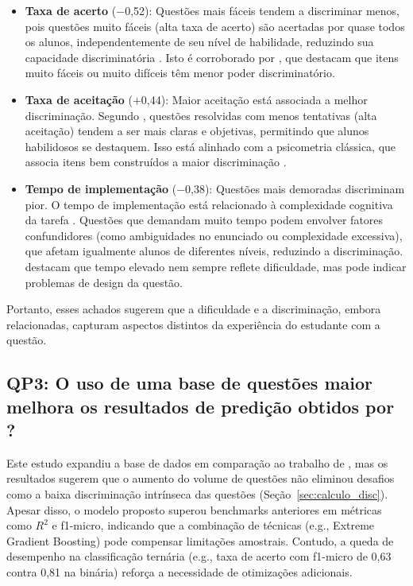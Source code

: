 \documentclass[12pt]{article}
\begin{document}
\begin{itemize}
    \item \textbf{Taxa de acerto} ($-$0,52): Questões mais fáceis tendem a discriminar menos, pois questões muito fáceis (alta taxa de acerto) são acertadas por quase todos os alunos, independentemente de seu nível de habilidade, reduzindo sua capacidade discriminatória \cite{Liz2020}. Isto é corroborado por \cite{pelanek2022complexity}, que destacam que itens muito fáceis ou muito difíceis têm menor poder discriminatório.
    \item \textbf{Taxa de aceitação} ($+$0,44): Maior aceitação está associada a melhor discriminação. Segundo \cite{elrik2022},  questões resolvidas com menos tentativas (alta aceitação) tendem a ser mais claras e objetivas, permitindo que alunos habilidosos se destaquem. Isso está alinhado com a psicometria clássica, que associa itens bem construídos a maior discriminação \cite{Liz2020}.
    \item \textbf{Tempo de implementação} ($-$0,38): Questões mais demoradas discriminam pior.  O tempo de implementação está relacionado à complexidade cognitiva da tarefa \cite{pelanek2022complexity}. Questões que demandam muito tempo podem envolver fatores confundidores (como ambiguidades no enunciado ou complexidade excessiva), que afetam igualmente alunos de diferentes níveis, reduzindo a discriminação. \cite{whalley2014} destacam que tempo elevado nem sempre reflete dificuldade, mas pode indicar problemas de design da questão.
\end{itemize}

Portanto, esses achados sugerem que a dificuldade e a discriminação, embora relacionadas, capturam aspectos distintos da experiência do estudante com a questão.

\subsection{QP3: O uso de uma base de questões maior melhora os resultados de predição obtidos por \cite{jackson2023}?}
\label{sec:resultados_QP3}

Este estudo expandiu a base de dados em comparação ao trabalho de \cite{jackson2023}, mas os resultados sugerem que o aumento do volume de questões não eliminou desafios como a baixa discriminação intrínseca das questões (Seção~\ref{sec:calculo_disc}). Apesar disso, o modelo proposto superou benchmarks anteriores em métricas como $R^2$ e f1-micro, indicando que a combinação de técnicas (e.g., Extreme Gradient Boosting) pode compensar limitações amostrais. Contudo, a queda de desempenho na classificação ternária (e.g., taxa de acerto com f1-micro de 0,63 contra 0,81 na binária) reforça a necessidade de otimizações adicionais.
\end{document}
